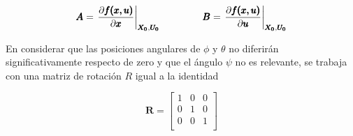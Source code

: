 \documentclass[twoside]{article}
\begin{document}
\begin{equation}
\pmb{A}=\left.{\frac{\partial \pmb{f(x,u)}}{\partial \pmb{x}}}\right\vert_{\pmb{X_0},\pmb{U_0}} \hspace*{1.5cm} \pmb{B}=\left.{\frac{\partial \pmb{f(x,u)}}{\partial \pmb{u}}}\right\vert_{\pmb{X_0},\pmb{U_0}}
\end{equation}


En considerar que las posiciones angulares de $\phi$ y $\theta$ no diferirán significativamente respecto de zero y que el ángulo $\psi$ no es relevante, se trabaja con una matriz de rotación $R$ igual a la identidad

\begin{equation}
\pmb{R}=\left[\begin{array}{ccc}
1 & 0 & 0 \\
0 & 1 & 0 \\
0 & 0 & 1 \\ \end{array} \right]
\end{equation}
\end{document}
